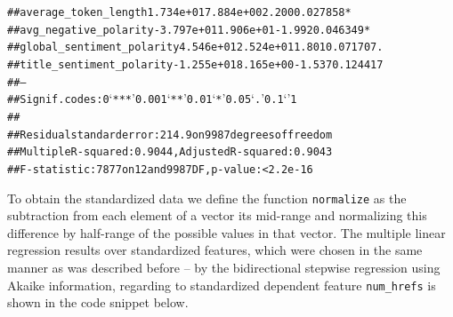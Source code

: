 \begin{knitrout}
\begin{kframe}
\begin{alltt}
## average_token_length       1.734e+01  7.884e+00   2.200 0.027858 *  
## avg_negative_polarity     -3.797e+01  1.906e+01  -1.992 0.046349 *  
## global_sentiment_polarity  4.546e+01  2.524e+01   1.801 0.071707 .  
## title_sentiment_polarity  -1.255e+01  8.165e+00  -1.537 0.124417    
## ---
## Signif. codes:  0 ‘***’ 0.001 ‘**’ 0.01 ‘*’ 0.05 ‘.’ 0.1 ‘ ’ 1
## 
## Residual standard error: 214.9 on 9987 degrees of freedom
## Multiple R-squared:  0.9044,	Adjusted R-squared:  0.9043 
## F-statistic:  7877 on 12 and 9987 DF,  p-value: < 2.2e-16
\end{alltt}
\end{kframe}
\end{knitrout}

To obtain the standardized data we define the function \texttt{normalize} as the subtraction from each element of a vector its mid-range and normalizing this difference by half-range of the possible values in that vector. The multiple linear regression results over standardized features,  which were chosen in the same manner as was described before -- by the bidirectional stepwise regression using  Akaike information, regarding to standardized dependent feature \texttt{num\_hrefs} is shown in the code snippet below. 
